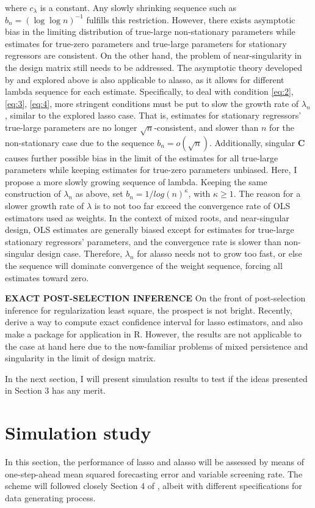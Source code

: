 \documentclass[12pt,a4paper]{article}
\begin{document}
where $ c_\lambda $ is a constant. Any slowly shrinking sequence such as $ b_n = (\log \log n)^{- 1} $ fulfills this restriction. However, there exists asymptotic bias in the limiting distribution of true-large non-stationary parameters while estimates for true-zero parameters and true-large parameters for stationary regressors are consistent. On the other hand, the problem of near-singularity in the design matrix still needs to be addressed. The asymptotic theory developed by \cite{knight2008shrinkage} and explored above is also applicable to alasso, as it allows for different lambda sequence for each estimate. Specifically, to deal with condition \eqref{eq:2}, \eqref{eq:3}, \eqref{eq:4}, more stringent conditions must be put to slow the growth rate of $ \lambda_n $, similar to the explored lasso case. That is, estimates for stationary regressors' true-large parameters are no longer $ \sqrt{n} $-consistent, and slower than $ n $ for the non-stationary case due to the sequence $ b_n = o(\sqrt{n}) $. Additionally, singular $ \bm{C} $ causes further possible bias in the limit of the estimates for all true-large parameters while keeping estimates for true-zero parameters unbiased. Here, I propose a more slowly growing sequence of lambda. Keeping the same construction of $ \lambda_n $ as above, set $ b_n =  1 / log(n)^\kappa $, with $ \kappa \geq 1 $. The reason for a slower growth rate of $ \lambda $ is to not too far exceed the convergence rate of OLS estimators used as weights. In the context of mixed roots, and near-singular design, OLS estimates are generally biased except for estimates for true-large stationary regressors' parameters, and the convergence rate is slower than non-singular design case. Therefore, $ \lambda_n $ for alasso needs not to grow too fast, or else the sequence will dominate convergence of the weight sequence, forcing all estimates toward zero.

\textbf{EXACT POST-SELECTION INFERENCE} On the front of post-selection inference for regularization least square, the prospect is not bright. Recently, \cite{lee2016exact} derive a way to compute exact confidence interval for lasso estimators, and also make a package for application in R. However, the results are not applicable to the case at hand here due to the now-familiar problems of mixed persistence and singularity in the limit of design matrix.

In the next section, I will present simulation results to test if the ideas presented in Section 3 has any merit.


\section{Simulation study}
In this section, the performance of lasso and alasso will be assessed by means of one-step-ahead mean squared forecasting error and variable screening rate. The scheme will followed closely Section 4 of \cite{lee2018lasso}, albeit with different specifications for data generating process.
\end{document}
